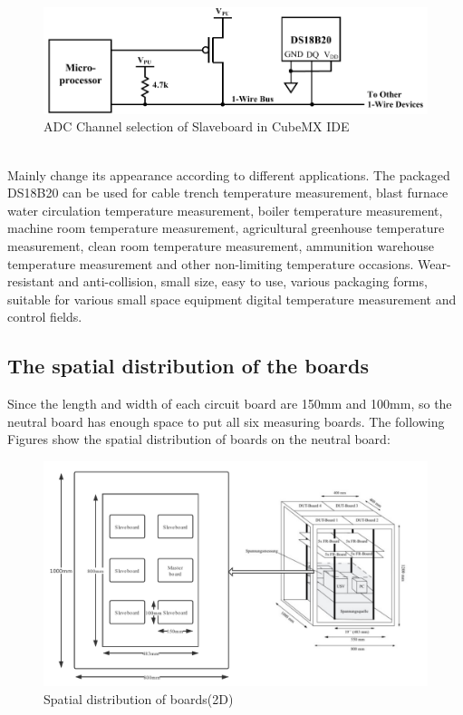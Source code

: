 \begin{figure}[!ht]
	\centering
	\includegraphics[width=15cm]{grafiken/5.1.pdf}
	\caption{ADC Channel selection of Slaveboard in CubeMX IDE} 
	\label{fig:5.1}
\end{figure}
\FloatBarrier
\\
Mainly change its appearance according to different applications. The packaged DS18B20 can be used for cable trench temperature measurement, blast furnace water circulation temperature measurement, boiler temperature measurement, machine room temperature measurement, agricultural greenhouse temperature measurement, clean room temperature measurement, ammunition warehouse temperature measurement and other non-limiting temperature occasions. Wear-resistant and anti-collision, small size, easy to use, various packaging forms, suitable for various small space equipment digital temperature measurement and control fields.

\subsection{The spatial distribution of the boards}
\label{sec:The spatial distribution of the boards}
Since the length and width of each circuit board are 150mm and 100mm, so the neutral board has enough space to put all six measuring boards. The following Figures show the spatial distribution of boards on the neutral board:
\begin{figure}[!ht]
	\centering
	\includegraphics[width=16cm]{grafiken/5.2.pdf}
	\caption{Spatial distribution of boards(2D)} 
	\label{fig:5.2}
\end{figure}
\FloatBarrier
\\

